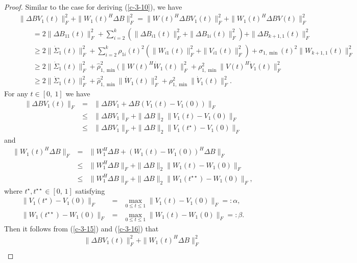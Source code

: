 \documentclass[11pt,a4paper]{article}
\numberwithin{equation}{section}
\newcommand {\wh} {\widehat}
\begin{document}
\begin{proof} Similar to the case for deriving (\ref{c-3-10}), we have
\begin{eqnarray}
\nonumber
&&\|{\Delta BV_1(t)}\|_F^2+
\|{W_1(t)^H\Delta B}\|_F^2
=\|{W(t)^H\Delta BV_1(t)}\|_F^2+
\|{W_1(t)^H\Delta BV(t)}\|_F^2\nonumber\\
\nonumber
&&\qquad=2\|{\Delta B_{11}(t)}\|_F^2
+\sum_{i=2}^k(\|{\Delta B_{i1}(t)}\|_F^2+\|{\Delta B_{1i}(t)}\|_F^2)
+\|{\Delta B_{k+1,1}(t)}\|_F^2\\
\nonumber
&&\qquad\ge2\|{\dot\Sigma_1(t)}\|_F^2+
\sum_{i=2}^k\rho_{1i}(t)^2(\|{W_{i1}(t)}\|_F^2+\|{V_{i1}(t)}\|_F^2)
+\sigma_{1,\min}(t)^2\|{W_{k+1,1}(t)}\|_F^2\\
\nonumber
&&\qquad\ge2\|{\dot\Sigma_1(t)}\|_F^2+\wh\rho_{1,\min}^2(\|{W(t)^H\dot W_{1}(t)}\|_F^2
+\rho_{1,\min}^2\|{V(t)^H\dot V_{1}(t)}\|_F^2\\
\label{ldtbd}
&&\qquad\ge 2\|{\dot\Sigma_1(t)}\|_F^2+\wh\rho_{1,\min}^2\|{\dot W_{1}(t)}\|_F^2+
\rho_{1,\min}^2\|{\dot V_{1}(t)}\|_F^2.
\end{eqnarray}
For any $t\in [0,~1]$ we have
\begin{eqnarray}\label{c-3-15}
\|{\Delta BV_1(t)}\|_F&=&\|{\Delta BV_1+\Delta B(V_1(t)-V_1(0))}\|_F\nonumber\\
&\le& \|{\Delta BV_1}\|_F+\|{\Delta B}\|_2\|{V_1(t)-V_1(0)}\|_F\nonumber\\
&\le& \|{\Delta BV_1}\|_F+\|{\Delta B}\|_2\|{V_1(t^\star)-V_1(0)}\|_F
\end{eqnarray}
and
\begin{eqnarray}\label{c-3-16}
\|{W_1(t)^H\Delta B}\|_F&=&\|{W_1^H\Delta B+(W_1(t)-W_1(0))^H\Delta B}\|_F\nonumber\\
&\le& \|{W_1^H\Delta B}\|_F+\|{\Delta B}\|_2\|{W_1(t)-W_1(0)}\|_F\nonumber\\
&\le& \|{W_1^H\Delta B}\|_F+\|{\Delta B}\|_2\|{W_1(t^{\star\star})-W_1(0)}\|_F,
\end{eqnarray}
where $t^\star,t^{\star\star}\in[0,\,1]$ satisfying
\begin{eqnarray*}
\|{V_1(t^\star)-V_1(0)}\|_F&=&\max_{0\le t\le 1}\|{V_1(t)-V_1(0)}\|_F=:\alpha,\\
\|{W_1(t^{\star\star})-W_1(0)}\|_F&=&\max_{0\le t\le 1}\|{W_1(t)-W_1(0)}\|_F=:\beta.
\end{eqnarray*}
Then it follows from (\ref{c-3-15}) and (\ref{c-3-16}) that
\begin{eqnarray}
\nonumber
&&\quad\|{\Delta BV_1(t)}\|_F^2+\|{W_1(t)^H\Delta B}\|_F^2\\

\end{eqnarray}
\end{proof}
\end{document}
